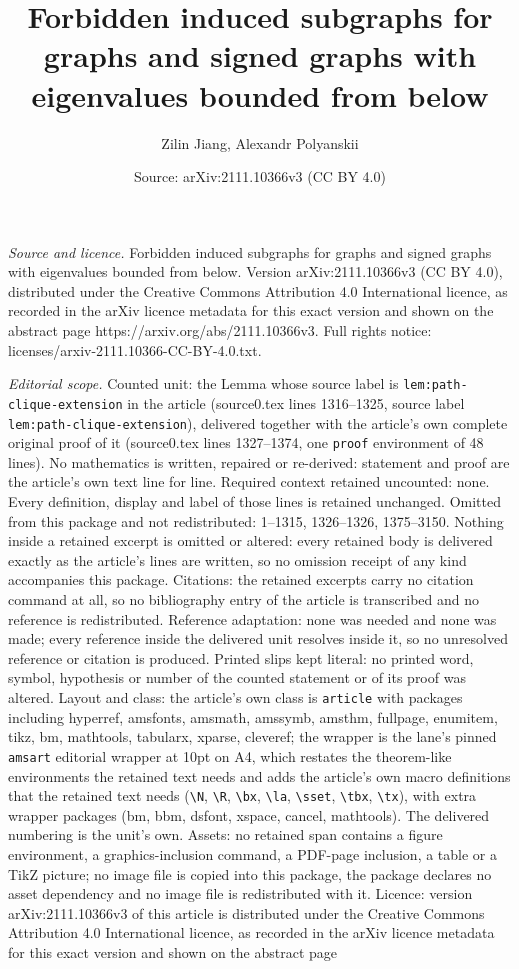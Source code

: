\documentclass[10pt,a4paper]{amsart}
\title[Forbidden induced subgraphs for graphs and signed graphs wit]{Forbidden induced subgraphs for graphs and signed graphs with eigenvalues bounded from below}
\author{Zilin Jiang, Alexandr Polyanskii}
\date{Source: arXiv:2111.10366v3 (CC BY 4.0)}
\begin{document}
\maketitle

\noindent\emph{Source and licence.} Forbidden induced subgraphs for graphs and signed graphs with eigenvalues bounded from below. Version arXiv:2111.10366v3 (CC BY 4.0), distributed under the Creative Commons Attribution 4.0 International licence, as recorded in the arXiv licence metadata for this exact version and shown on the abstract page https://arxiv.org/abs/2111.10366v3. Full rights notice: licenses/arxiv-2111.10366-CC-BY-4.0.txt.\par\smallskip

\noindent\textit{Editorial scope.} Counted unit: the Lemma whose source label is \texttt{lem:path-clique-extension} in the article (source0.tex lines 1316--1325, source label \texttt{lem:path-clique-extension}), delivered together with the article's own complete original proof of it (source0.tex lines 1327--1374, one \texttt{proof} environment of 48 lines). No mathematics is written, repaired or re-derived: statement and proof are the article's own text line for line. Required context retained uncounted: none. Every definition, display and label of those lines is retained unchanged. Omitted from this package and not redistributed: 1--1315, 1326--1326, 1375--3150. Nothing inside a retained excerpt is omitted or altered: every retained body is delivered exactly as the article's lines are written, so no omission receipt of any kind accompanies this package. Citations: the retained excerpts carry no citation command at all, so no bibliography entry of the article is transcribed and no reference is redistributed. Reference adaptation: none was needed and none was made; every reference inside the delivered unit resolves inside it, so no unresolved reference or citation is produced. Printed slips kept literal: no printed word, symbol, hypothesis or number of the counted statement or of its proof was altered. Layout and class: the article's own class is \texttt{article} with packages including hyperref, amsfonts, amsmath, amssymb, amsthm, fullpage, enumitem, tikz, bm, mathtools, tabularx, xparse, cleveref; the wrapper is the lane's pinned \texttt{amsart} editorial wrapper at 10pt on A4, which restates the theorem-like environments the retained text needs and adds the article's own macro definitions that the retained text needs (\texttt{\textbackslash N}, \texttt{\textbackslash R}, \texttt{\textbackslash bx}, \texttt{\textbackslash la}, \texttt{\textbackslash sset}, \texttt{\textbackslash tbx}, \texttt{\textbackslash tx}), with extra wrapper packages (bm, bbm, dsfont, xspace, cancel, mathtools). The delivered numbering is the unit's own. Assets: no retained span contains a figure environment, a graphics-inclusion command, a PDF-page inclusion, a table or a TikZ picture; no image file is copied into this package, the package declares no asset dependency and no image file is redistributed with it. Licence: version arXiv:2111.10366v3 of this article is distributed under the Creative Commons Attribution 4.0 International licence, as recorded in the arXiv licence metadata for this exact version and shown on the abstract page 
\end{document}
